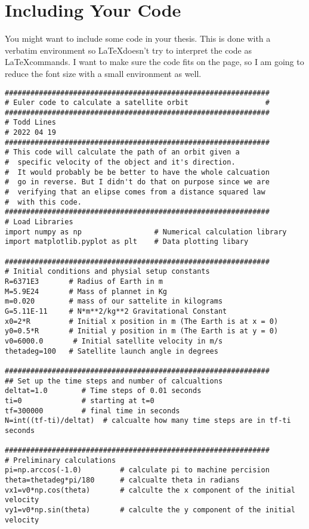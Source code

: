 \chapter{Including Your Code} \label{AppendixCode}
\label{app:Talk}

You might want to include some code in your thesis. This is done with a verbatim environment so \LaTeX \enspace doesn't try to interpret the code as \LaTeX \enspace commands. I want to make sure the code fits on the page, so I am going to reduce the font size with a small environment as well. 
\begin{small}
\begingroup
\makeatletter
\@totalleftmargin=-1cm
	\begin{verbatim}
##############################################################
# Euler code to calculate a satellite orbit                  #
##############################################################
# Todd Lines
# 2022 04 19
##############################################################
# This code will calculate the path of an orbit given a 
#  specific velocity of the object and it's direction. 
#  It would probably be be better to have the whole calcuation 
#  go in reverse. But I didn't do that on purpose since we are
#  verifying that an elipse comes from a distance squared law
#  with this code.
##############################################################
# Load Libraries
import numpy as np                 # Numerical calculation library
import matplotlib.pyplot as plt    # Data plotting libary

##############################################################
# Initial conditions and physial setup constants
R=6371E3       # Radius of Earth in m
M=5.9E24       # Mass of plannet in Kg
m=0.020        # mass of our sattelite in kilograms
G=5.11E-11     # N*m**2/kg**2 Gravitational Constant
x0=2*R         # Initial x position in m (The Earth is at x = 0)
y0=0.5*R       # Initial y position in m (The Earth is at y = 0)
v0=6000.0       # Initial satellite velocity in m/s
thetadeg=100   # Satellite launch angle in degrees

##############################################################
## Set up the time steps and number of calcualtions
deltat=1.0        # Time steps of 0.01 seconds
ti=0              # starting at t=0
tf=300000         # final time in seconds
N=int((tf-ti)/deltat)  # calcualte how many time steps are in tf-ti seconds

##############################################################
# Preliminary calculations
pi=np.arccos(-1.0)         # calculate pi to machine percision
theta=thetadeg*pi/180      # calcualte theta in radians
vx1=v0*np.cos(theta)       # calculte the x component of the initial velocity
vy1=v0*np.sin(theta)       # calculte the y component of the initial velocity


\end{verbatim}
\end{small}
